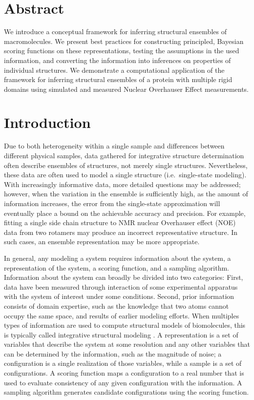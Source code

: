 \documentclass[../main.tex]{subfiles}
\begin{document}
\begin{refsection}

\section{Abstract}\label{abstract}

We introduce a conceptual framework  for inferring structural ensembles of macromolecules.
We present best practices for constructing principled, Bayesian scoring functions on these representations, testing the assumptions in the used information, and converting the information into inferences on properties of individual structures.
We demonstrate a computational application of the framework for inferring structural ensembles of a protein with multiple rigid domains using simulated and measured Nuclear Overhauser Effect measurements.

\section{Introduction}\label{introduction}

Due to both heterogeneity within a single sample and differences between different physical samples, data gathered for integrative structure determination often describe ensembles of structures, not merely single structures.
Nevertheless, these data are often used to model a single structure (i.e.~single-state modeling).
With increasingly informative data, more detailed questions may be addressed;
however, when the variation in the ensemble is sufficiently high, as the amount of information increases, the error from the single-state approximation will eventually place a bound on the achievable accuracy and precision.
For example, fitting a single side chain structure to NMR nuclear Overhauser effect (NOE) data from two rotamers may produce an incorrect representative structure.
In such cases, an ensemble representation may be more appropriate.

In general, any modeling a system requires information about the system, a representation of the system, a scoring function, and a sampling algorithm.
Information about the system can broadly be divided into two categories:
First, data have been measured through interaction of some experimental apparatus with the system of interest under some conditions.
Second, prior information consists of domain expertise, such as the knowledge that two atoms cannot occupy the same space, and results of earlier modeling efforts.
When multiples types of information are used to compute structural models of biomolecules, this is typically called integrative structural modeling .
A representation is a set of variables that describe the system at some resolution and any other variables that can be determined by the information, such as the magnitude of noise; a configuration is a single realization of those variables, while a sample is a set of configurations.
A scoring function maps a configuration to a real number that is used to evaluate consistency of any given configuration with the information.
A sampling algorithm generates candidate configurations using the scoring function.


\end{refsection}
\end{document}
